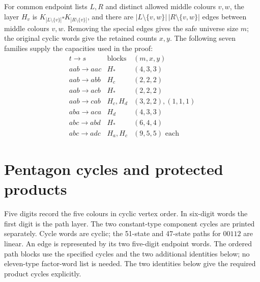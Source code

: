 For common endpoint lists $L,R$ and distinct allowed middle colours $v,w$,
the layer $H_v$ is
$K_{|L\setminus\{v\}|}\square K_{|R\setminus\{v\}|}$, and there are
$|L\setminus\{v,w\}|\,|R\setminus\{v,w\}|$ edges between middle
colours $v,w$. Removing the special edges gives the safe universe
size $m$; the original cyclic words give the retained counts $x,y$.
The following seven families supply the capacities used in the proof:
\[
\begin{array}{c|c|c}
t\to s&\text{blocks}&(m,x,y)\\\hline
aab\to aac&H_*&(4,3,3)\\
aab\to abb&H_c&(2,2,2)\\
aab\to acb&H_*&(2,2,2)\\
aab\to cab&H_c,H_d&(3,2,2),(1,1,1)\\
aba\to aca&H_d&(4,3,3)\\
abc\to abd&H_*&(6,4,4)\\
abc\to adc&H_a,H_c&(9,5,5)\text{ each}
\end{array}
\]
\section{Pentagon cycles and protected products}
\label{app:pentagon-factor-words}
Five digits record the five colours in cyclic vertex order. In six-digit
words the first digit is the path layer. The two constant-type component
cycles are printed separately. Cycle words are cyclic; the
51-state and 47-state paths for $00112$ are linear.
An edge is represented by its two five-digit endpoint words.
The ordered path blocks use the specified cycles and the two
additional identities below; no eleven-type factor-word list is needed.
The two identities below give the required product cycles explicitly.

